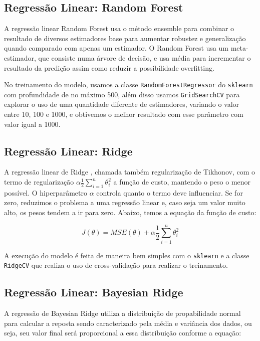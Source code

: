 \documentclass[conference]{IEEEtran}
\newcommand{\ttt}[1]{{\texttt{#1}}}
\begin{document}
\subsection{Regressão Linear: Random Forest}

A regressão  linear Random  Forest \cite{ho1995random} usa  o método
ensemble para combinar  o resultado de diversos  estimadores base para
aumentar  robustez e  generalização quando  comparado com  apenas um
estimador. O  Random Forest usa  um meta-estimador, que  consiste numa
árvore  de decisão,  e usa  média para  incrementar o  resultado da
predição assim como reduzir a possibilidade overfitting.

No treinamento do modelo,  usamos a classe \ttt{RandomForestRegressor}
do  \ttt{sklearn} com  profundidade  de no  máximo  500, além  disso
usamos  \ttt{GridSearchCV}  para  explorar  o uso  de  uma  quantidade
diferente de  estimadores, variando o  valor entre  10, 100 e  1000, e
obtivemos o  melhor resultado  com esse parâmetro  com valor  igual a
1000.

\subsection{Regressão Linear: Ridge}

A  regressão linear  de  Ridge \cite{tikhonov2013numerical},  chamada
também regularização  de Tikhonov,  com o termo  de regularização
$\alpha\frac{1}{2}\sum_{i=1}^{n}  \theta_i^{2}$ a  função de  custo,
mantendo o peso o menor possível. O hiperparâmetro $\alpha$ controla
quanto o termo  deve influenciar. Se for zero, reduzimos  o problema a
uma  regressão linear  e, caso  seja um  valor muito  alto, os  pesos
tendem a ir para zero. Abaixo, temos a equação da função de custo:

\begin{equation}
  J(\theta)=MSE(\theta) + \alpha\frac{1}{2}\sum_{i=1}^{n} \theta_i^{2}
\end{equation}

A  execução  do  modelo  é  feita de  maneira  bem  simples  com  o
\ttt{sklearn}  e  a   classe  \ttt{RidgeCV}  que  realiza   o  uso  de
cross-validação para realizar o treinamento.

\subsection{Regressão Linear: Bayesian Ridge}

A  regressão de  Bayesian Ridge  \cite{mackay1992bayesian} utiliza  a
distribuição de  propabilidade normal para calcular  a reposta sendo
caracterizado pela média  e variância dos dados, ou  seja, seu valor
final será proporcional a essa distribuição conforme a equação:
\end{document}
